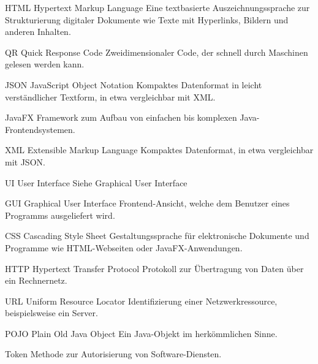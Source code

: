   {HTML}            %
  {Hypertext Markup Language}  %
  {Eine textbasierte Auszeichnungssprache zur Strukturierung digitaler Dokumente wie Texte mit Hyperlinks, Bildern und anderen Inhalten.} %
  
  {QR}            %
  {Quick Response Code}  %
  {Zweidimensionaler Code, der schnell durch Maschinen gelesen werden kann.} %
  
  {JSON}            %
  { JavaScript Object Notation}  %
  {Kompaktes Datenformat in leicht verständlicher Textform, in etwa vergleichbar mit XML.} %
  
  {JavaFX}            %
  {Framework zum Aufbau von einfachen bis komplexen Java-Frontendsystemen.} %

  {XML}            %
  { Extensible Markup Language}  %
  {Kompaktes Datenformat, in etwa vergleichbar mit JSON.} %
  
  {UI}            %
  { User Interface}  %
  {Siehe Graphical User Interface} %

  {GUI}            %
  { Graphical User Interface}  %
  {Frontend-Ansicht, welche dem Benutzer eines Programms ausgeliefert wird.} %

  {CSS}            %
  { Cascading Style Sheet}  %
  {Gestaltungssprache für elektronische Dokumente und Programme wie HTML-Webseiten oder JavaFX-Anwendungen.} %

  {HTTP}            %
  { Hypertext Transfer Protocol}  %
  {Protokoll zur Übertragung von Daten über ein Rechnernetz.} %

  {URL}            %
  { Uniform Resource Locator}  %
  {Identifizierung einer Netzwerkressource, beispielsweise ein Server.} %
  
  {POJO}            %
  { Plain Old Java Object}  %
  {Ein Java-Objekt im herkömmlichen Sinne.} %
  
  {Token}            %
  {Methode zur Autorisierung von Software-Diensten.} %
  
